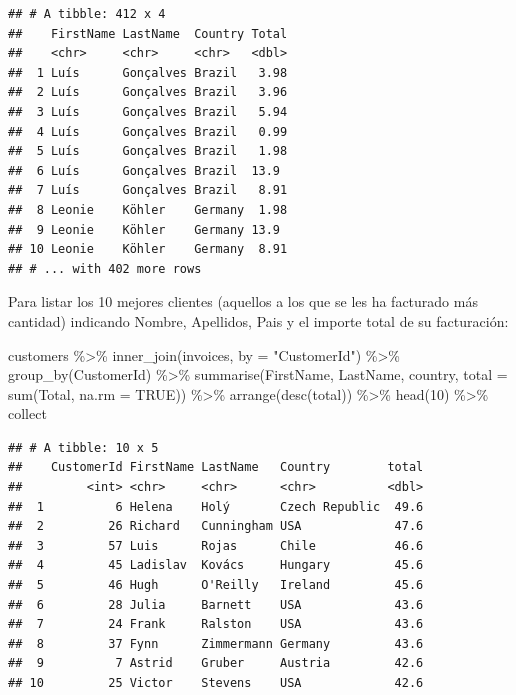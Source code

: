 \documentclass[
]{book}
\newenvironment{Shaded}{\begin{snugshade}}{\end{snugshade}}
\newcommand{\AttributeTok}[1]{\textcolor[rgb]{0.77,0.63,0.00}{#1}}
\newcommand{\ConstantTok}[1]{\textcolor[rgb]{0.00,0.00,0.00}{#1}}
\newcommand{\DecValTok}[1]{\textcolor[rgb]{0.00,0.00,0.81}{#1}}
\newcommand{\FunctionTok}[1]{\textcolor[rgb]{0.00,0.00,0.00}{#1}}
\newcommand{\NormalTok}[1]{#1}
\newcommand{\SpecialCharTok}[1]{\textcolor[rgb]{0.00,0.00,0.00}{#1}}
\newcommand{\StringTok}[1]{\textcolor[rgb]{0.31,0.60,0.02}{#1}}
\theoremstyle{break}
\theoremstyle{nonumberplain}
\begin{document}
\begin{verbatim}
## # A tibble: 412 x 4
##    FirstName LastName  Country Total
##    <chr>     <chr>     <chr>   <dbl>
##  1 Luís      Gonçalves Brazil   3.98
##  2 Luís      Gonçalves Brazil   3.96
##  3 Luís      Gonçalves Brazil   5.94
##  4 Luís      Gonçalves Brazil   0.99
##  5 Luís      Gonçalves Brazil   1.98
##  6 Luís      Gonçalves Brazil  13.9 
##  7 Luís      Gonçalves Brazil   8.91
##  8 Leonie    Köhler    Germany  1.98
##  9 Leonie    Köhler    Germany 13.9 
## 10 Leonie    Köhler    Germany  8.91
## # ... with 402 more rows
\end{verbatim}

Para listar los 10 mejores clientes (aquellos a los que se les ha facturado más cantidad) indicando Nombre, Apellidos, Pais y el importe total de su facturación:

\begin{Shaded}
\begin{Highlighting}[]
\NormalTok{customers }\SpecialCharTok{\%\textgreater{}\%} \FunctionTok{inner\_join}\NormalTok{(invoices, }\AttributeTok{by =} \StringTok{"CustomerId"}\NormalTok{) }\SpecialCharTok{\%\textgreater{}\%} \FunctionTok{group\_by}\NormalTok{(CustomerId) }\SpecialCharTok{\%\textgreater{}\%} 
    \FunctionTok{summarise}\NormalTok{(FirstName, LastName, country, }\AttributeTok{total =} \FunctionTok{sum}\NormalTok{(Total, }\AttributeTok{na.rm =} \ConstantTok{TRUE}\NormalTok{)) }\SpecialCharTok{\%\textgreater{}\%}  
    \FunctionTok{arrange}\NormalTok{(}\FunctionTok{desc}\NormalTok{(total)) }\SpecialCharTok{\%\textgreater{}\%} \FunctionTok{head}\NormalTok{(}\DecValTok{10}\NormalTok{) }\SpecialCharTok{\%\textgreater{}\%}\NormalTok{ collect}
\end{Highlighting}
\end{Shaded}

\begin{verbatim}
## # A tibble: 10 x 5
##    CustomerId FirstName LastName   Country        total
##         <int> <chr>     <chr>      <chr>          <dbl>
##  1          6 Helena    Holý       Czech Republic  49.6
##  2         26 Richard   Cunningham USA             47.6
##  3         57 Luis      Rojas      Chile           46.6
##  4         45 Ladislav  Kovács     Hungary         45.6
##  5         46 Hugh      O'Reilly   Ireland         45.6
##  6         28 Julia     Barnett    USA             43.6
##  7         24 Frank     Ralston    USA             43.6
##  8         37 Fynn      Zimmermann Germany         43.6
##  9          7 Astrid    Gruber     Austria         42.6
## 10         25 Victor    Stevens    USA             42.6
\end{verbatim}
\end{document}
